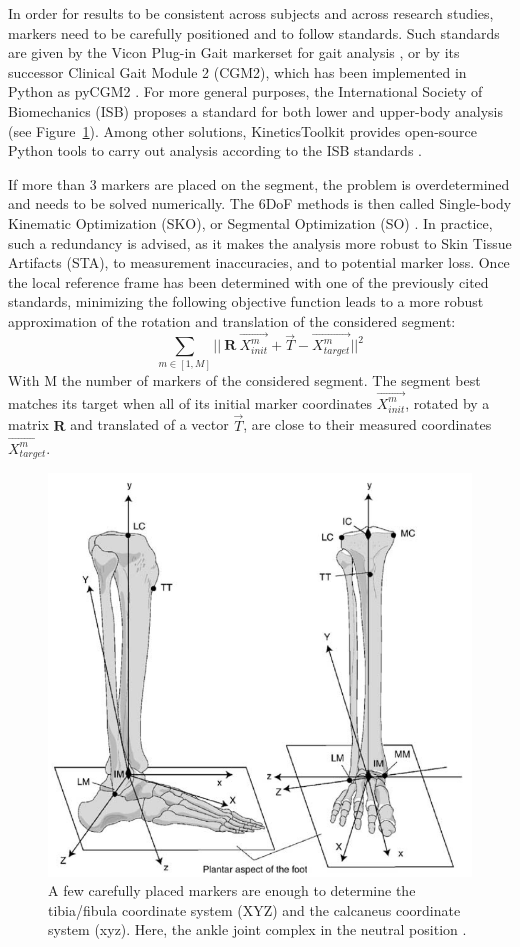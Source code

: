 In order for results to be consistent across subjects and across research studies, markers need to be carefully positioned and to follow standards. Such standards are given by the Vicon Plug-in Gait markerset for gait analysis \cite{Davis1991}, or by its successor Clinical Gait Module 2 (CGM2), which has been implemented in Python as pyCGM2 \cite{Leboeuf2019b}. For more general purposes, the International Society of Biomechanics (ISB) proposes a standard for both lower and upper-body analysis \cite{Wu2002, Wu2005} (see Figure~\ref{fig_isb}). Among other solutions, KineticsToolkit provides open-source Python tools to carry out analysis according to the ISB standards \cite{Chenier2021}.

If more than 3 markers are placed on the segment, the problem is overdetermined and needs to be solved numerically. The 6DoF methods is then called Single-body Kinematic Optimization (SKO), or Segmental Optimization (SO) \cite{Lu1999}. In practice, such a redundancy is advised, as it makes the analysis more robust to Skin Tissue Artifacts (STA), to measurement inaccuracies, and to potential marker loss. Once the local reference frame has been determined with one of the previously cited standards, minimizing the following objective function leads to a more robust approximation of the rotation and translation of the considered segment: 
\begin{equation}
  \sum_{m \in [1,M]}
  ||\ \textbf{R} \ \overrightarrow{X_{init}^m} + \overrightarrow{T} - \overrightarrow{X_{target}^m} ||^2
\end{equation} 
With M the number of markers of the considered segment. The segment best matches its target when all of its initial marker coordinates $\overrightarrow{X_{init}^m}$, rotated by a matrix $\textbf{R}$ and translated of a vector $\overrightarrow{T}$, are close to their measured coordinates $\overrightarrow{X_{target}^m}$. 

\begin{figure}[!ht]
	\centering
	\def\svgwidth{1\columnwidth}
	\fontsize{10pt}{10pt}\selectfont
	\includegraphics[width=0.7\linewidth]{"../Chap2/Figures/ISBaxis.PNG"}
	\caption{A few carefully placed markers are enough to determine the tibia/fibula coordinate system (XYZ) and the calcaneus coordinate system (xyz). Here, the ankle joint complex in the neutral position \cite{Wu2002}.}
	\label{fig_isb}
\end{figure}


